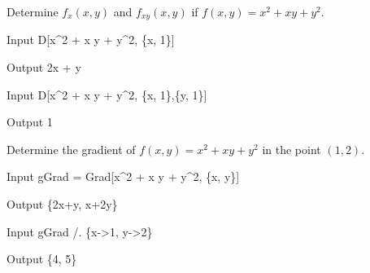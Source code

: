 \begin{example}
Determine $f_x(x,y)$ and $f_{xy}(x,y)$ if $f(x,y) = x^2+xy+y^2$.
	
\begin{mdframed}[default,backgroundcolor=gray!40,roundcorner=8pt]
	

	\begin{mmaCell}[functionlocal={x_,x}]{Input}
		D[x^2 + x y + y^2, \{x, 1\}]
	\end{mmaCell}
	\begin{mmaCell}{Output}
		2x + y
	\end{mmaCell}
	\begin{mmaCell}[functionlocal={y,x}]{Input}
		D[x^2 + x y + y^2, \{x, 1\},\{y, 1\}]
	\end{mmaCell}
	\begin{mmaCell}{Output}
		1
	\end{mmaCell}
\end{mdframed}

Determine the gradient of $f(x,y) = x^2+xy+y^2$ in the point $(1,2)$.

\begin{mdframed}[default,backgroundcolor=gray!40,roundcorner=8pt]
	\begin{mmaCell}[functionlocal={y,x}]{Input}
		gGrad = Grad[x^2 + x y + y^2, \{x, y\}]
	\end{mmaCell}
	\begin{mmaCell}{Output}
		\{2x+y, x+2y\}
	\end{mmaCell}

	\begin{mmaCell}[functionlocal={y,x}]{Input}
		gGrad /. \{x->1, y->2\}
	\end{mmaCell}
	\begin{mmaCell}{Output}
		\{4, 5\}
	\end{mmaCell}
\end{mdframed}
\end{example}


%

